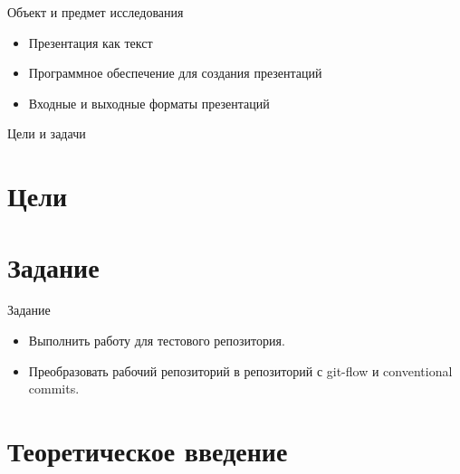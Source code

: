 \documentclass[
  ignorenonframetext,
  aspectratio=169,
  russian,
]{beamer}
\providecommand{\tightlist}{%
  \setlength{\itemsep}{0pt}\setlength{\parskip}{0pt}}
\begin{document}
\begin{frame}{Объект и предмет исследования}
\protect{}\label{ux43eux431ux44aux435ux43aux442-ux438-ux43fux440ux435ux434ux43cux435ux442-ux438ux441ux441ux43bux435ux434ux43eux432ux430ux43dux438ux44f}
\begin{itemize}[<+->]
\tightlist
\item
  Презентация как текст
\item
  Программное обеспечение для создания презентаций
\item
  Входные и выходные форматы презентаций
\end{itemize}
\end{frame}

\begin{frame}{Цели и задачи}
\protect{}\label{ux446ux435ux43bux438-ux438-ux437ux430ux434ux430ux447ux438}
\end{frame}

\section{Цели}\label{ux446ux435ux43bux438}

\section{Задание}\label{ux437ux430ux434ux430ux43dux438ux435}

\begin{frame}{Задание}
\begin{itemize}[<+->]
\tightlist
\item
  Выполнить работу для тестового репозитория.
\item
  Преобразовать рабочий репозиторий в репозиторий с git-flow и
  conventional commits.
\end{itemize}
\end{frame}

\section{Теоретическое
введение}\label{ux442ux435ux43eux440ux435ux442ux438ux447ux435ux441ux43aux43eux435-ux432ux432ux435ux434ux435ux43dux438ux435}
\end{document}
